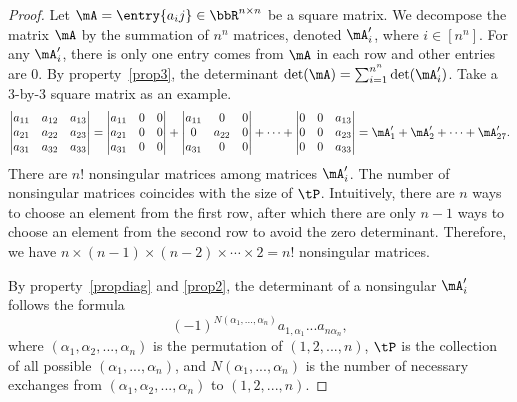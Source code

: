\documentclass[11pt]{article}
\theoremstyle{plain}
\theoremstyle{definition}
\begin{document}
\begin{proof}
	Let $\mA = \entry{a_ij} \in \bbR^{n \times n}$ be a square matrix. We decompose the  matrix $\mA$ by the summation of $n^n$ matrices, denoted $\mA'_i$, where $i \in [n^n]$. For any $\mA'_i$, there is only one entry comes from $\mA$ in each row and other entries are 0. By property~\ref{prop3}, the determinant $\det(\mA) = \sum_{i=1}^{n^n} \det(\mA'_i)$. Take a 3-by-3 square matrix as an example.
	\begin{align}
		\begin{vmatrix}
			a_{11} & a_{12} & a_{13}\\
			a_{21} & a_{22} & a_{23}\\
			a_{31} & a_{32} & a_{33}
		\end{vmatrix} = \begin{vmatrix}
			a_{11} & 0& 0\\
			a_{21} & 0 & 0\\
			a_{31} &0 & 0
		\end{vmatrix} + \begin{vmatrix}
			a_{11} & 0& 0\\
			0 & a_{22} & 0\\
			a_{31} &0 & 0
		\end{vmatrix} + \cdots +\begin{vmatrix}
			0 & 0& a_{13}\\
			0& 0 & a_{23}\\
			 0&0 & a_{33}
		\end{vmatrix} = \mA'_1 + \mA'_2 +\cdots + \mA'_{27}.
	\end{align}
	There are $n!$ nonsingular matrices among matrices $\mA'_i$. The number of nonsingular matrices coincides with the size of $\tP$. Intuitively, there are $n$ ways to choose an element from the first row, after which there are only $n-1$ ways to choose an element from the second row to avoid the zero determinant. Therefore, we have $n \times (n-1) \times (n-2) \times \cdots \times 2 = n!$ nonsingular matrices.
	
	By property~\ref{propdiag} and \ref{prop2}, the determinant of a nonsingular $\mA'_i$ follows the formula \[(-1)^{N(\alpha_1,...,\alpha_n)}  a_{1,\alpha_1} ... a_{n \alpha_n},\]
	where $(\alpha_1, \alpha_2, ...,\alpha_n)$ is the permutation of $(1,2,...,n)$, $\tP$ is the collection of all possible  $(\alpha_1,...,\alpha_n)$, and $N(\alpha_1,...,\alpha_n)$ is the number of necessary exchanges from $(\alpha_1,\alpha_2,...,\alpha_n)$  to $(1,2,...,n)$. 
\end{proof}
\end{document}
